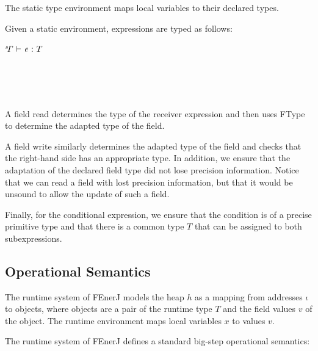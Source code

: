 The static type environment \sG{} maps local variables to their
declared types.

Given a static environment, expressions are typed as follows:

\vspace{1.0ex}
\noindent
\begin{ottdefnblock}[#1]{$ \mathit{ {^s}\!\Gamma} \  \textsf{$\vdash$} \  \mathit{e} \  \textsf{:} \  T $}{}
\begin{centering}
\ottusedrule{\ottdruletrXXread{}}\\[2mm]
\ottusedrule{\ottdruletrXXwrite{}}\\[2mm]
\ottusedrule{\ottdruletrXXcond{}}\\
\end{centering}
\end{ottdefnblock}
\vspace{1.5ex}

A field read determines the type of the receiver expression and then
uses FType to determine the adapted type of the field.

A field write similarly determines the adapted type of the field and
checks that the right-hand side has an appropriate type.
In addition, we ensure that the adaptation of the declared field type
did not lose precision information.
Notice that we can read a field with lost precision information, but
that it would be unsound to allow the update of such a field.

Finally, for the conditional expression, we ensure that the condition
is of a precise primitive type and that there is a common type $T$
that can be assigned to both subexpressions.



\subsection{Operational Semantics}

The runtime system of FEnerJ models the heap $h$ as a mapping from
addresses $\iota$ to objects, where objects are a pair of the runtime
type $T$ and the field values $v$ of the object.
The runtime environment \rG{} maps local variables $x$ to values
$v$.

The runtime system of FEnerJ defines a standard big-step operational
semantics:

